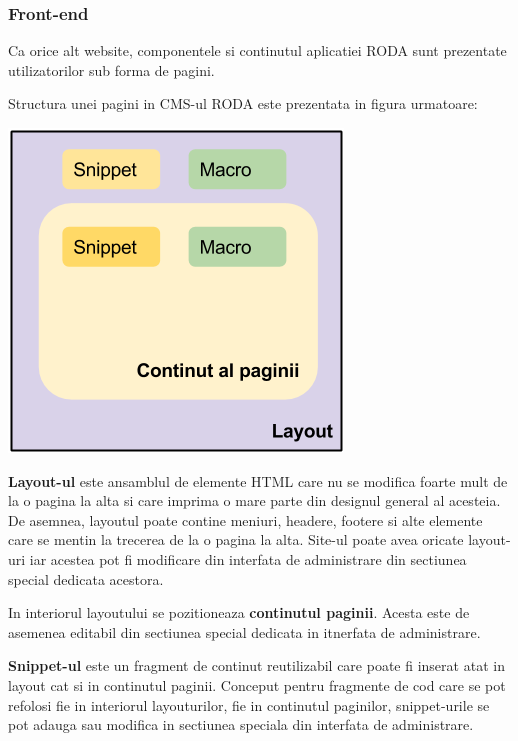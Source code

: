 \documentclass[a4paper, 10pt]{article}
\begin{document}
{\bigskip

\subsubsection*{Front-end}

Ca orice alt website, componentele si continutul aplicatiei RODA sunt prezentate utilizatorilor sub forma de pagini. 



\bigskip

Structura unei pagini in CMS-ul RODA este prezentata in figura urmatoare:
\begin{center}
\includegraphics[scale=0.6]{roda-page.png}
\end{center}



\textbf{Layout-ul} este ansamblul de elemente HTML care nu se modifica foarte mult de la o pagina la alta si care imprima o mare parte din designul general al acesteia. De asemnea, layoutul poate contine meniuri, headere, footere si alte elemente care se mentin la trecerea de la o pagina la alta. Site-ul poate avea oricate layout-uri iar acestea pot fi modificare din interfata de administrare din sectiunea special dedicata acestora.



\bigskip

In interiorul layoutului se pozitioneaza \textbf{continutul paginii}. Acesta este de asemenea editabil din sectiunea special dedicata in itnerfata de administrare. 



\bigskip

\textbf{Snippet-ul} este un fragment de continut reutilizabil care poate fi inserat atat in layout cat si in continutul paginii. Conceput pentru fragmente de cod care se pot refolosi fie in interiorul layouturilor, fie in continutul paginilor, snippet-urile se pot adauga sau modifica in sectiunea speciala din interfata de administrare. 



}
\end{document}
